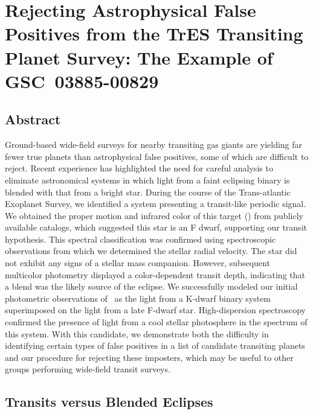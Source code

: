 \chapter[Rejecting Astrophysical False Positives from the TrES Transiting Planet Survey: The Example of \mbox{GSC 03885-00829}]{Rejecting Astrophysical False Positives from the TrES Transiting Planet Survey: The Example of \mbox{GSC 03885-00829}%
\protect\CFNA%
}
\label{cha:gsc}

\section*{Abstract}
\label{cha:gsc:sec:abs}

  Ground-based wide-field surveys for nearby transiting gas giants
  are yielding far fewer true planets than astrophysical false
  positives, some of which are difficult to reject. Recent experience
  has highlighted the need for careful analysis to eliminate
  astronomical systems in which light from a faint eclipsing binary is
  blended with that from a bright star. During the course of the
  Trans-atlantic Exoplanet Survey, we identified a system presenting
  a transit-like periodic signal. We obtained the proper motion and
  infrared color of this target (\gscOTE) from publicly available
  catalogs, which suggested this star is an F dwarf, supporting our
  transit hypothesis.  This spectral classification was confirmed
  using spectroscopic observations from which we determined the
  stellar radial velocity. The star did not exhibit any signs of a
  stellar mass companion. However, subsequent multicolor photometry
  displayed a color-dependent transit depth, indicating that a blend
  was the likely source of the eclipse. We successfully modeled our
  initial photometric observations of \gscOTE\ as the light from a K-dwarf binary system superimposed on the light from a late F-dwarf
  star. High-dispersion spectroscopy confirmed the presence of light
  from a cool stellar photosphere in the spectrum of this system. With
  this candidate, we demonstrate both the difficulty in identifying
  certain types of false positives in a list of candidate transiting
  planets and our procedure for rejecting these imposters, which may
  be useful to other groups performing wide-field transit surveys.

\section{Transits versus Blended Eclipses}
\label{cha:gsc:sec:intro}

